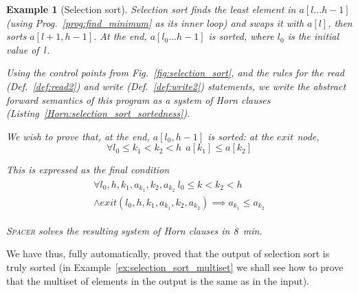 \documentclass[a4paper]{article}
\newcommand{\soft}[1]{\textsc{#1}}
\theoremstyle{definition}
\theoremstyle{plain}
\newtheorem{example}{Example}
\begin{document}
\begin{example}[Selection sort]\label{ex:selection_sort_sortedness}
Selection sort finds the least element in $a[l \dots h-1]$ (using Prog.~\ref{prog:find_minimum} as its inner loop) and swaps it with $a[l]$, then sorts $a[l+1,h-1]$. At the end, $a[l_0\dots h-1]$ is sorted, where $l_0$ is the initial value of~$l$.



Using the control points from Fig.~\ref{fig:selection_sort}, and the rules for the read (Def.~\ref{def:read2}) and write (Def.~\ref{def:write2}) statements, we write the abstract forward semantics of this program as a system of Horn clauses (Listing~\ref{Horn:selection_sort_sortedness}).

We wish to prove that, at the end, $a[l_0,h-1]$ is sorted: at the $\mathit{exit}$ node,
\begin{equation}
\forall l_0 \leq k_1 < k_2 < h~~ a[k_1] \leq a[k_2]
\end{equation}

This is expressed as the final condition
\begin{align}
\begin{aligned}
\forall l_0,h,k_1,a_{k_1},k_2,a_{k_2}~
  l_0 \leq k < k_2 < h \\ \land \mathit{exit}(l_0, h, k_1, a_{k_1}, k_2, a_{k_2})
  \implies a_{k_1} \leq a_{k_2}
\end{aligned}
\end{align}

\soft{Spacer} solves the resulting system of Horn clauses in 8~min.
\end{example}

We have thus, fully automatically, proved that the output of selection sort is truly sorted (in Example~\ref{ex:selection_sort_multiset} we shall see how to prove that the multiset of elements in the output is the same as in the input).
\end{document}
